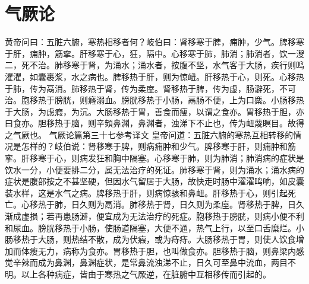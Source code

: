 \documentclass[a4paper,12pt,UTF8,twoside]{ctexbook}
\begin{document}
\chapter{气厥论}
黄帝问曰：五脏六腑，寒热相移者何？岐伯曰：肾移寒于脾，痈肿，少气。脾移寒于肝，痈肿，筋挛。肝移寒于心，狂，隔中。心移寒于肺，肺消；肺消者，饮一溲二，死不治。肺移寒于肾，为涌水；涌水者，按腹不坚，水气客于大肠，疾行则鸣濯濯，如囊裹浆，水之病也。脾移热于肝，则为惊衄。肝移热于心，则死。心移热于肺，传为鬲消。肺移热于肾，传为柔庢。肾移热于脾，传为虚，肠澼死，不可治。胞移热于膀胱，则癃溺血。膀胱移热于小肠，鬲肠不便，上为口麋。小肠移热于大肠，为虑瘕，为沉。大肠移热于胃，善食而瘦，以谓之食亦。胃移热于胆，亦曰食亦。胆移热于脑，则辛頞鼻渊，鼻渊者，浊涕下不止也，传为衄蔑瞑目。故得之气厥也。
气厥论篇第三十七参考译文
皇帝问道：五脏六腑的寒热互相转移的情况是怎样的？岐伯说：肾移寒于脾，则病痈肿和少气。脾移寒于肝，则痈肿和筋挛。肝移寒于心，则病发狂和胸中隔塞。心移寒于肺，则为肺消；肺消病的症状是饮水一分，小便要排二分，属无法治疗的死证。肺移寒于肾，则为涌水；涌水病的症状是腹部按之不甚坚硬，但因水气留居于大肠，故快走时肠中濯濯鸣响，如皮囊装水样，这是水气之病。脾移热于肝，则病惊骇和鼻衄。肝移热于心，则引起死亡。心移热于肺，日久则为鬲消。肺移热于肾，日久则为柔庢。肾移热于脾，日久渐成虚损；若再患肠澼，便宜成为无法治疗的死症。胞移热于膀胱，则病小便不利和尿血。膀胱移热于小肠，使肠道隔塞，大便不通，热气上行，以至口舌糜烂。小肠移热于大肠，则热结不散，成为伏瘕，或为痔痔。大肠移热于胃，则使人饮食增加而体瘦无力，病称为食亦。胃移热于胆，也叫做食亦。胆移热于脑，则鼻梁内感觉辛辣而成为鼻渊，鼻渊症状，是常鼻流浊涕不止，日久可至鼻中流血，两目不明。以上各种病症，皆由于寒热之气厥逆，在脏腑中互相移传而引起的。
\end{document}
